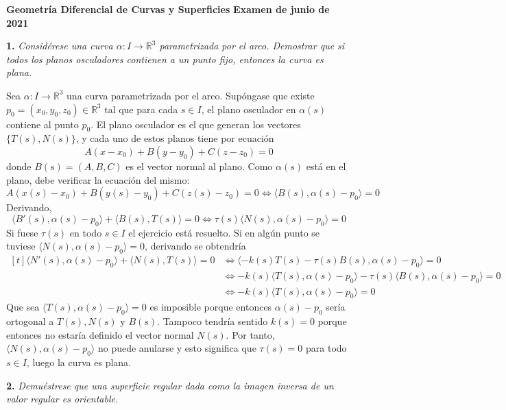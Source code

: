 \documentclass[12pt]{report}
\newcommand{\R}{\mathbb R}
\begin{document}
\small

\textbf{Geometría Diferencial de Curvas y Superficies} \hfill \textbf{Examen de junio de 2021}
\linebreak

\textbf{1.} \textit{Considérese una curva $\alpha \colon I \to \R^3$ parametrizada por el arco. Demostrar que si todos los planos osculadores contienen a un punto fijo, entonces la curva es plana.}

\vspace{2mm}
Sea $\alpha \colon I \to \R^3$ una curva parametrizada por el arco. Supóngase que existe $p_0 = (x_0,y_0,z_0) \in \R^3$ tal que para cada $s \in I$, el plano osculador en $\alpha(s)$ contiene al punto $p_0$. El plano osculador es el que generan los vectores $\{T(s),N(s)\}$, y cada uno de estos planos tiene por ecuación
\[A(x-x_0)+B(y-y_0)+C(z-z_0) = 0\]
donde $B(s) = (A,B,C)$ es el vector normal al plano. Como $\alpha(s)$ está en el plano, debe verificar la ecuación del mismo:
\[A(x(s)-x_0) + B(y(s)-y_0)+C(z(s)-z_0) = 0 \iff \langle B(s),\alpha(s)-p_0 \rangle = 0 \]
Derivando,
\[\langle B'(s), \alpha(s)-p_0 \rangle + \langle B(s),T(s) \rangle = 0 \iff \tau(s) \langle N(s),\alpha(s)-p_0 \rangle = 0\]
Si fuese $\tau(s)$ en todo $s \in I$ el ejercicio está resuelto. Si en algún punto se tuviese $\langle N(s),\alpha(s)-p_0 \rangle = 0$, derivando se obtendría
\[
\begin{aligned}[t]
   \langle N'(s),\alpha(s)-p_0 \rangle+\langle N(s),T(s) \rangle = 0 &\iff \langle -k(s)T(s)-\tau(s)B(s) , \alpha(s)-p_0\rangle = 0 \\
   &\iff -k(s)\langle T(s),\alpha(s)-p_0 \rangle -\tau(s) \langle B(s),\alpha(s)-p_0 \rangle = 0 \\
   &\iff -k(s)\langle T(s),\alpha(s)-p_0 \rangle = 0
\end{aligned}
\]
Que sea $\langle T(s),\alpha(s)-p_0 \rangle = 0$ es imposible porque entonces $\alpha(s)-p_0$ sería ortogonal a $T(s),N(s)$ y $B(s)$. Tampoco tendría sentido $k(s)=0$ porque entonces no estaría definido el vector normal $N(s)$. Por tanto, $\langle N(s),\alpha(s)-p_0 \rangle$ no puede anularse y esto significa que $\tau(s) = 0$ para todo $s \in I$, luego la curva es plana.

\vspace{4mm}
\textbf{2.} \textit{Demuéstrese que una superficie regular dada como la imagen inversa de un valor regular es orientable.}
\end{document}
